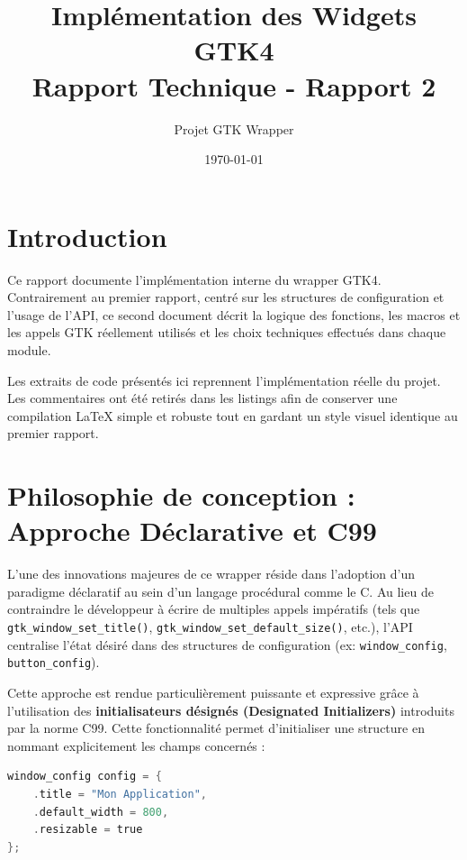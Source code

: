\documentclass[12pt,a4paper]{article}
\title{Implémentation des Widgets GTK4 \\ Rapport Technique - Rapport 2}
\author{Projet GTK Wrapper}
\date{\today}
\begin{document}
\maketitle

\tableofcontents

\newpage

\section{Introduction}
Ce rapport documente l'implémentation interne du wrapper GTK4. Contrairement au premier rapport, centré sur les structures de configuration et l'usage de l'API, ce second document décrit la logique des fonctions, les macros et les appels GTK réellement utilisés et les choix techniques effectués dans chaque module.

Les extraits de code présentés ici reprennent l'implémentation réelle du projet. Les commentaires ont été retirés dans les listings afin de conserver une compilation LaTeX simple et robuste tout en gardant un style visuel identique au premier rapport.

\section{Philosophie de conception : Approche Déclarative et C99}

L'une des innovations majeures de ce wrapper réside dans l'adoption d'un paradigme déclaratif au sein d'un langage procédural comme le C. Au lieu de contraindre le développeur à écrire de multiples appels impératifs (tels que \texttt{gtk\_window\_set\_title()}, \texttt{gtk\_window\_set\_default\_size()}, etc.), l'API centralise l'état désiré dans des structures de configuration (ex: \texttt{window\_config}, \texttt{button\_config}).

Cette approche est rendue particulièrement puissante et expressive grâce à l'utilisation des \textbf{initialisateurs désignés (Designated Initializers)} introduits par la norme C99. Cette fonctionnalité permet d'initialiser une structure en nommant explicitement les champs concernés :

\begin{lstlisting}[language=C]
window_config config = {
    .title = "Mon Application",
    .default_width = 800,
    .resizable = true
};
\end{lstlisting}
\end{document}
